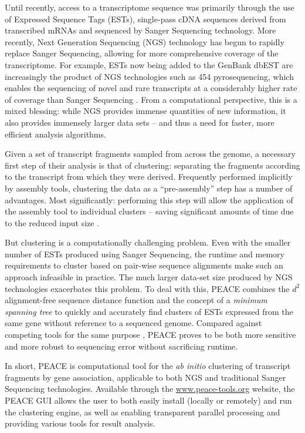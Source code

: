 \documentclass[a4,center,fleqn]{NAR}
\newcommand{\peace} {{\small PEACE}}
\begin{document}
Until recently, access to a transcriptome sequence was primarily
through the use of Expressed Sequence Tags (ESTs), single-pass cDNA
sequences derived from transcribed mRNAs and sequenced by Sanger
Sequencing technology.  More recently, Next Generation Sequencing
(NGS) technology has begun to rapidly replace Sanger Sequencing,
allowing for more comprehensive coverage of the transcriptome.  For
example, ESTs now being added to the GenBank dbEST are increasingly
the product of NGS technologies such as 454 pyrosequencing, which
enables the sequencing of novel and rare transcripts at a considerably
higher rate of coverage than Sanger Sequencing
\cite{Cheung2006,Emrich2007}.  From a computational perspective, this
is a mixed blessing: while NGS provides immense quantities of new
information, it also provides immensely larger data sets -- and thus a
need for faster, more efficient analysis algorithms.

Given a set of transcript fragments sampled from across the genome, a
necessary first step of their analysis is that of clustering: separating
the fragments according to the transcript from which they were
derived.  Frequently performed implicitly by assembly tools,
clustering the data as a ``pre-assembly'' step has a number of
advantages.  Most significantly: performing this step will
allow the application of the assembly tool to individual clusters --
saving significant amounts of time due to the reduced input size
\cite{Hazelhurst08a}.  

But clustering is a computationally challenging problem.  Even with
the smaller number of ESTs produced using Sanger Sequencing, the
runtime and memory requirements to cluster based on pair-wise sequence
alignments make such an approach infeasible in practice.  The much
larger data-set size produced by NGS technologies exacerbates this
problem.  To deal with this, \peace\/ combines the $d^2$
alignment-free sequence distance function \cite{Hide94} and the
concept of a {\it minimum spanning tree} \cite{Prim57} to quickly and
accurately find clusters of ESTs expressed from the same gene without
reference to a sequenced genome.  Compared against competing tools for
the same purpose
\cite{Burke99,Slater00,Huang99,Parkinson02,Kalyanaraman03,Malde03,
  Ptitsyn05,Hazelhurst08a,Picardi09}, \peace\/ proves to be both more
sensitive and more robust to sequencing error without sacrificing
runtime.


In short, \peace\/ is computational tool for the {\it ab initio}
clustering of transcript fragments by gene association, applicable to
both NGS and traditional Sanger Sequencing technologies.  Available
through the \href{http://www.peace-tools.org}{www.peace-tools.org}
website, the \peace\/ GUI allows the user to both easily install
(locally or remotely) and run the clustering engine, as well as
enabling transparent parallel processing and providing various tools
for result analysis.
\end{document}
